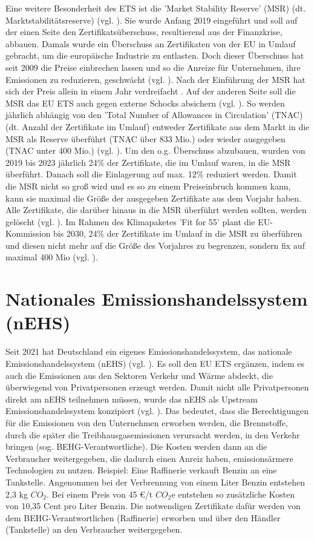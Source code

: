 Eine weitere Besonderheit des ETS ist die 'Market Stability Reserve' (MSR) (dt. Marktstabilitätsreserve) (vgl. \cite{eu3.2023}). Sie wurde Anfang 2019 eingeführt und soll auf der einen Seite den Zertifikatsüberschuss, resultierend aus der Finanzkrise, abbauen.
Damals wurde ein Überschuss an Zertifikaten von der EU in Umlauf gebracht, um die europäische Industrie zu entlasten.
Doch dieser Überschuss hat seit 2009 die Preise einbrechen lassen und so die Anreize für Unternehmen, ihre Emissionen zu reduzieren, geschwächt (vgl. \cite{eu3.2023}). Nach der Einführung der MSR hat sich der Preis allein in einem Jahr verdreifacht .
Auf der anderen Seite soll die MSR das EU ETS auch gegen externe Schocks absichern (vgl. \cite{eu3.2023}).
So werden jährlich abhängig von den 'Total Number of Allowances in Circulation' (TNAC) (dt. Anzahl der Zertifikate im Umlauf) entweder Zertifikate aus dem Markt in die MSR als Reserve überführt (TNAC über 833 Mio.) oder wieder ausgegeben (TNAC unter 400 Mio.) (vgl. \cite[S. 7]{icap2.2023}).
Um den o.g. Überschuss abzubauen, wurden von 2019 bis 2023 jährlich 24\% der Zertifikate, die im Umlauf waren, in die MSR überführt.
Danach soll die Einlagerung auf max. 12\% reduziert werden. Damit die MSR nicht so groß wird und es so zu einem Preiseinbruch kommen kann, kann sie maximal die Größe der ausgegeben Zertifikate aus dem Vorjahr haben.
Alle Zertifikate, die darüber hinaus in die MSR überführt werden sollten, werden gelöscht (vgl. \cite{eu3.2023}).
Im Rahmen des Klimapaketes 'Fit for 55' plant die EU-Kommission bis 2030, 24\% der Zertifikate im Umlauf in die MSR zu überführen und diesen nicht mehr auf die Größe des Vorjahres zu begrenzen, sondern fix auf maximal 400 Mio (vgl. \cite{ub.2023}).

\section{Nationales Emissionshandelssystem (nEHS)}

Seit 2021 hat Deutschland ein eigenes Emissionshandelssystem, das nationale Emissionshandelssystem (nEHS) (vgl. \cite{dehst.2023}). Es soll den EU ETS ergänzen, indem es auch die Emissionen aus den Sektoren Verkehr und Wärme abdeckt, die überwiegend von Privatpersonen erzeugt werden.
Damit nicht alle Privatpersonen direkt am nEHS teilnehmen müssen, wurde das nEHS als Upstream Emissionshandelssystem konzipiert (vgl. \cite{dehst.2023}).
Das bedeutet, dass die Berechtigungen für die Emissionen von den Unternehmen erworben werden, die Brennstoffe, durch die später die Treibhausgasemissionen verursacht werden, in den Verkehr bringen (sog. BEHG-Verantwortliche).
Die Kosten werden dann an die Verbraucher weitergegeben, die dadurch einen Anreiz haben, emissionsärmere Technologien zu nutzen. Beispiel: Eine Raffinerie verkauft Benzin an eine Tankstelle.
Angenommen bei der Verbrennung von einem Liter Benzin entstehen 2,3 kg $CO_2$. Bei einem Preis von 45 €/t $CO_2$e entstehen so zusätzliche Kosten von 10,35 Cent pro Liter Benzin.
Die notwendigen Zertifikate dafür werden von dem BEHG-Verantwortlichen (Raffinerie) erworben und über den Händler (Tankstelle) an den Verbraucher weitergegeben.

